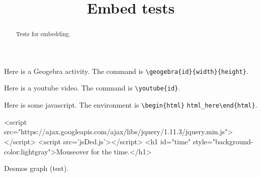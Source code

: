 \documentclass{ximera}
\title{Embed tests}
\begin{document}
	
\begin{abstract}
Tests for embedding.
\end{abstract}

\maketitle

Here is a Geogebra activity. The command is \verb!\geogebra{id}{width}{height}!.


Here is a youtube video. The command is \verb!\youtube{id}!.


Here is some javascript. The environment is \verb!\begin{html}! \verb!html_here!\verb!\end{html}!.

\begin{html}
<script src="https://ajax.googleapis.com/ajax/libs/jquery/1.11.3/jquery.min.js"></script>
<script src='jsDed.js'></script>
<h1 id="time" style="background-color:lightgray">Mouseover for the time.</h1>
\end{html}

Desmos graph (test).


\end{document}
